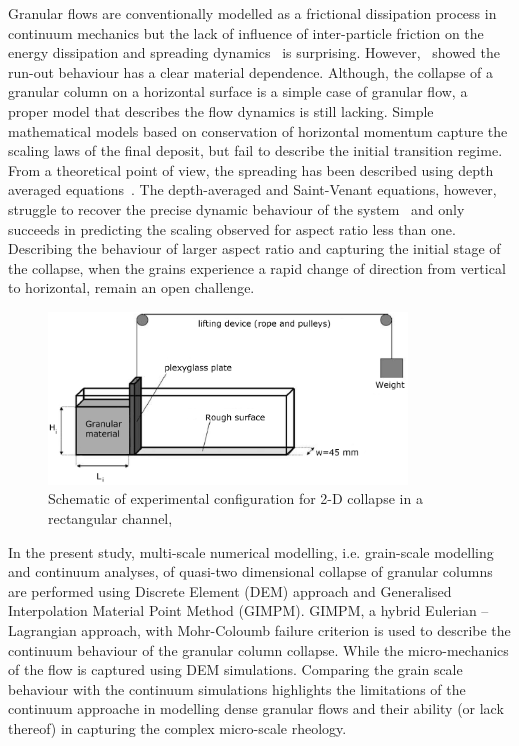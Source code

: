 Granular flows are conventionally modelled as a frictional dissipation process 
in continuum mechanics but the lack of influence of inter-particle friction on 
the energy dissipation and spreading dynamics~\citep{Lube2005} is surprising. 
However,~\citet{Kerswell2005} showed the run-out behaviour has a clear material 
dependence. Although, the collapse of a granular column on a 
horizontal surface is a simple case of granular flow, a proper model 
that describes the flow dynamics is still lacking. Simple mathematical models 
based on conservation of horizontal momentum capture the scaling laws of the 
final deposit, but fail to describe the initial transition regime. From a 
theoretical point of view, the spreading has been described using depth 
averaged equations~\citep{Kerswell2005,Larrieu2006}. The depth-averaged and 
Saint-Venant equations, however, struggle to recover the precise dynamic behaviour of the system~\citep{Warnett2013} and only succeeds in predicting the scaling observed for aspect ratio less than one. Describing the behaviour of larger aspect ratio and capturing the initial stage of the collapse, when the grains experience a rapid change of direction from vertical to horizontal, remain an open challenge.


\begin{figure}[tbhp]
\centering
\includegraphics[width=0.85\textwidth]{experiment_setup}
\caption{Schematic of experimental configuration for 2-D collapse in a 
rectangular channel,~\citep{Lajeunesse2004}}
\label{fig:exp}
\end{figure}

In the present study, multi-scale numerical modelling, i.e. grain-scale 
modelling and continuum analyses, of quasi-two dimensional collapse of 
granular columns are performed using Discrete Element (DEM) approach and 
Generalised Interpolation Material Point Method (GIMPM). GIMPM, a hybrid 
Eulerian -- Lagrangian approach, with Mohr-Coloumb failure criterion is used to 
describe the continuum behaviour of the granular column collapse. While the 
micro-mechanics of the flow is captured using DEM simulations. Comparing the 
grain scale behaviour with the continuum simulations highlights the limitations 
of the continuum approache in modelling dense granular flows and their ability 
(or lack thereof) in capturing the complex micro-scale rheology.

